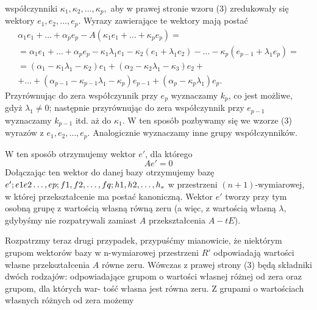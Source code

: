 \documentclass{article}
\begin{document}
współczynniki \begin{math}\kappa_1, \kappa_2, \ldots , \kappa_p,\end{math} aby w prawej stronie wzoru (3) zredukowały się wektory \begin{math}e_1, e_2, \ldots, e_p.\end{math} Wyrazy zawierające te wektory mają postać
\begin{displaymath}
\begin{array}{c}
\alpha_1e_1+\ldots+\alpha_pe_p-A(\kappa_1e_1+\ldots+\kappa_pe_p)= \\
=\alpha_1e_1+\ldots+\alpha_pe_p-\kappa_1\lambda_1e_1-\kappa_2(e_1+\lambda_1e_2)-\ldots-\kappa_p(e_{p-1}+\lambda_1e_p)= \\
=(\alpha_1-\kappa_1\lambda_1-\kappa_2)e_1+(\alpha_2-\kappa_2\lambda_1-\kappa_3)e_2+\\
+\ldots+(\alpha_{p-1}-\kappa_{p-1}\lambda_1-\kappa_p)e_{p-1}+(\alpha_p-\kappa_p\lambda_1)e_p.
\end{array}
\end{displaymath}
Przyrównując do zera współczynnik przy $e_p$ wyznaczamy $k_p$, co jest możliwe, gdyż $\lambda_1 \ne 0$;
następnie przyrównując do zera współczynnik przy $e_{p-1}$ wyznaczamy $k_{p-1}$ itd. aż do $\kappa_1$. 
W ten sposób pozbywamy się we wzorze (3) wyrazów z \begin{math}e_1, e_2, \ldots, e_p.\end{math} Analogicznie wyznaczamy inne grupy współczynników.
\par W ten sposób otrzymujemy wektor $e'$, dla którego
$$Ae'=0$$
Dołączając ten wektor do danej bazy otrzymujemy bazę \begin{math}e'; e1 e2 \ldots, ep; f1, f2\\, \ldots, fq; h1, h2, \ldots, h_s\end{math} w przestrzeni $(n+1)$-wymiarowej, w której przekształcenie ma postać kanoniczną. Wektor $e'$ tworzy przy tym osobną grupę z wartością własną równą zeru (a więc, z wartością własną $\lambda$, gdybyśmy nie rozpatrywali zamiast $A$ przekształcenia $A-tE$).
 \par   Rozpatrzmy teraz drugi przypadek, przypuśćmy mianowicie, że niektórym grupom
wektorów bazy w n-wymiarowej przestrzeni $R'$ odpowiadają wartości własne przekształcenia $A$ równe zeru. Wówczas z prawej strony (3) będą składniki dwóch rodzajów:
odpowiadające grupom o wartości własnej różnej od zera oraz grupom, dla których war-
tość własna jest równa zeru. Z grupami o wartościach własnych różnych od zera możemy
\end{document}
